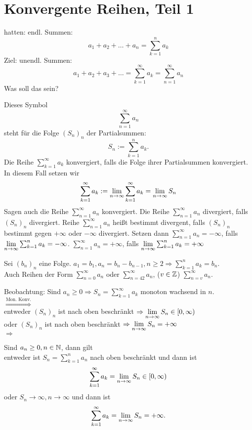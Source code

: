 \section{Konvergente Reihen, Teil 1}
hatten: endl. Summen: \[ a_1+a_2+\dots+a_n = \sum_{k=1}^{n}a_k \]
Ziel: unendl. Summen: \[ a_1+a_2+a_3+\dots = \sum_{k=1}^{\infty}a_k = \sum_{n=1}^{\infty}a_n \]
Was soll das sein?
\begin{defi}
	Dieses Symbol \[ \sum_{n=1}^{\infty}a_n \] steht für die Folge \((S_n)_n\) der Partialsummen: \[S_n := \sum_{k=1}^{n}a_k .\]
	Die Reihe \( \sum_{k=1}^{\infty}a_k \) konvergiert, falls die Folge ihrer Partialsummen konvergiert. In diesem Fall setzen wir 
	\[ \sum_{k=1}^{\infty}a_k := \lim\limits_{n\rightarrow\infty} \sum_{k=1}^{\infty}a_k = \lim\limits_{n\rightarrow\infty} S_n \]
	Sagen auch die Reihe \( \sum_{n=1}^{\infty}a_n \) konvergiert. Die Reihe \( \sum_{n=1}^{\infty}a_n \) divergiert, falls \( (S_n)_n \) divergiert. Reihe \( \sum_{n=1}^{\infty}a_n \) heißt bestimmt divergent, falls \((S_n)_n\) bestimmt gegen \(+ \infty \) oder \(-\infty\) divergiert. Setzen dann \( \sum_{n=1}^{\infty}a_n =-\infty \), falls \(\lim\limits_{n\rightarrow\infty} \sum_{k=1}^{n}a_k = -\infty \). \( \sum_{n=1}^{\infty}a_n = +\infty \), falls \( \lim\limits_{n\rightarrow\infty}\sum_{k=1}^{n}a_k=+\infty \)
\end{defi}
\begin{bem}
	Sei \((b_n)_n\) eine Folge. \(a_1 = b_1, a_n = b_n-b_{n-1}, n\geq 2 \Rightarrow \sum_{k=1}^{n}a_k = b_n \).\\
	Auch Reihen der Form \( \sum_{n=0}^{\infty}a_n \) oder \( \sum_{n=42}^{\infty}a_n\), (\(v\in\mathbb{Z}\)) \(\sum_{n=v}^{\infty}a_n\).
\end{bem}
Beobachtung: Sind \(a_n \geq 0 \Rightarrow S_n = \sum_{k=1}^{\infty}a_k \) monoton wachsend in \(n\).\\
\( \overset{\text{Mon. Konv.}}{\Rightarrow}\)\\
entweder \((S_n)_n\) ist nach oben beschränkt \( \Rightarrow \lim\limits_{n\rightarrow\infty} S_n \in [0,\infty) \)\\
oder \((S_n)_n\) ist nach oben beschränkt \( \Rightarrow \lim\limits_{n\rightarrow\infty} S_n  = +\infty \)\\
\( \Rightarrow \)
\begin{satz}
	Sind \(a_n \geq 0, n\in\mathbb{N} \), dann gilt\\
	entweder ist \(S_n = \sum_{k=1}^{n}a_n\) nach oben beschränkt und dann ist \[ \sum_{k=1}^{\infty}a_k = \lim\limits_{n\rightarrow\infty}S_n \in [0,\infty) \]
	oder \(S_n \rightarrow \infty, n\rightarrow\infty \) und dann ist \[ \sum_{k=1}^{\infty}a_k = \lim\limits_{n\rightarrow\infty}S_n = +\infty. \]
\end{satz}
